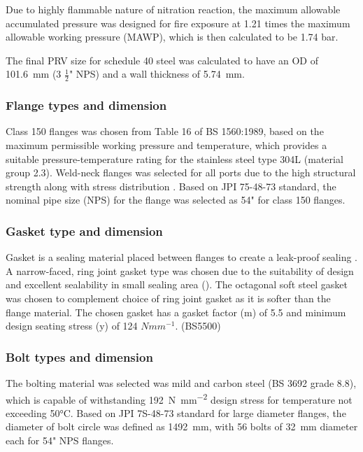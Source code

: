 Due to highly flammable nature of nitration reaction, the maximum allowable accumulated pressure was designed for fire exposure at 1.21 times the maximum allowable working pressure (MAWP), which is then calculated to be 1.74 bar. 

The final PRV size for schedule 40 steel was calculated to have an OD of \SI{101.6}{\milli \metre} (3 $\frac{1}{2}$" NPS) and a wall thickness of \SI{5.74}{\milli \metre}.



\subsubsection{Flange types and dimension}
Class 150 flanges was chosen from Table 16 of BS 1560:1989, based on the maximum permissible working pressure and temperature, which provides a suitable pressure-temperature rating for the stainless steel type 304L (material group 2.3). Weld-neck flanges was selected for all ports due to the high structural strength along with stress distribution \cite{ulma_forge_welding_2020}.
Based on JPI 75-48-73 standard, the nominal pipe size (NPS) for the flange was selected as 54" for class 150 flanges.
\subsubsection{Gasket type and dimension}
Gasket is a sealing material placed between flanges to create a leak-proof sealing \cite{varun_piping_nodate}. A narrow-faced, ring joint gasket type was chosen due to the suitability of design and excellent sealability in small sealing area (). The octagonal soft steel gasket was chosen to complement choice of ring joint gasket as it is softer than the flange material. The chosen gasket has a gasket factor (m) of 5.5 and minimum design seating stress (y) of 124 $Nmm^{-1}$. (BS5500)

\subsubsection{Bolt types and dimension}
The bolting material was selected was mild and carbon steel (BS 3692 grade 8.8), which is capable of withstanding \SI{192}{\N\per\square\mm} design stress for temperature not exceeding 50°C. Based on JPI 7S-48-73 standard for large diameter flanges, the diameter of bolt circle was defined as \SI{1492}{\milli \metre}, with 56 bolts of \SI{32}{\milli \metre} diameter each for 54" NPS flanges. 

